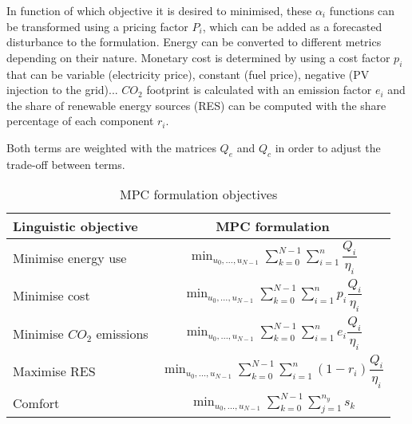 \documentclass[10pt]{extarticle}
\begin{document}
In function of which objective it is desired to minimised, these $\alpha_i$
functions can be transformed using a pricing factor $P_i$, which can be added
as a forecasted disturbance to the formulation. Energy can be converted to
different metrics depending on their nature. Monetary cost is determined 
by using a cost factor $p_i$ that can be variable (electricity price),
constant (fuel price), negative (PV injection to the grid)... $CO_2$ footprint
is calculated with an emission factor $e_i$ and the share of renewable energy
sources (RES) can be computed with the share percentage of each component $r_i$.
 
Both terms are weighted with the matrices $Q_e$ and $Q_c$
in order to adjust the trade-off between terms.

\renewcommand{\arraystretch}{2.5}
\begin{table}[h]
	\centering
	\caption{MPC formulation objectives}
	\label{tab:mpc_form:objectives}
	\begin{tabular}{l|c}
		\toprule
		\textbf{Linguistic objective}  & \textbf{MPC formulation} \\
		\midrule
		Minimise energy use &   $ \min_{u_0, \ldots, u_{N-1}} \sum_{k=0}^{N-1} \sum_{i=1}^{n} \dfrac{Q_{i}}{\eta_i}$ \\
		Minimise cost & $ \min_{u_0, \ldots, u_{N-1}} \sum_{k=0}^{N-1} \sum_{i=1}^{n} p_i \dfrac{Q_{i}}{\eta_i}$  \\
		Minimise $CO_2$ emissions & $ \min_{u_0, \ldots, u_{N-1}} \sum_{k=0}^{N-1} \sum_{i=1}^{n}  e_i \dfrac{Q_{i}}{\eta_i}$  \\
		Maximise RES &  $ \min_{u_0, \ldots, u_{N-1}} \sum_{k=0}^{N-1} \sum_{i=1}^{n} (1-r_i) \dfrac{Q_{i}}{\eta_i}$  \\
		Comfort &  $ \min_{u_0, \ldots, u_{N-1}} \sum_{k=0}^{N-1} \sum_{j=1}^{n_y} s_k$  \\
		\bottomrule 
	\end{tabular}
\end{table}
\end{document}
